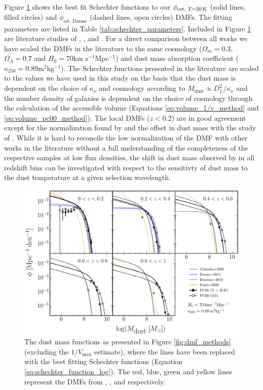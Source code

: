 Figure \ref{fig:dmf_schechter} shows the best fit Schechter functions to our $\phi_{\textrm{est, T=20\,K}}$ (solid lines, filled circles) and $\phi_{\textrm{est, Dunne}}$ (dashed lines, open circles) DMFs. The fitting parameters are listed in Table \ref{tab:schechter_parameters}. Included in Figure \ref{fig:dmf_schechter} are literature studies of \citealt{Vlahakis_2005}, \citealt{Dunne_2011}, \citealt{Beeston_2018} and \citealt{Pozzi_2020}. For a direct comparison between all works we have scaled the DMFs in the literature to the same cosmology ($\Omega_m = 0.3$, $\Omega_\Lambda = 0.7$ and $H_0 = 70$km s$^{-1}$Mpc$^{-1}$) and dust mass absorption coefficient ($\kappa_{250} = 0.89$m$^{2}$kg$^{-1}$). The Schechter functions presented in the literature are scaled to the values we have used in this study on the basis that the dust mass is dependent on the choice of $\kappa_\nu$ and cosmology according to $M_{\textrm{dust}} \propto D_L^2/\kappa_\nu$ and the number density of galaxies is dependent on the choice of cosmology through the calculation of the accessible volume (Equations \ref{eq:volume_1/v_method} and \ref{eq:volume_pc00_method}). The local DMFs ($z < 0.2$) are in good agreement except for the normalization found by \citealt{Dunne_2011} and the offset in dust mass with the study of \citealt{Pozzi_2020}. While it is hard to reconcile the low normalization of the \citealt{Dunne_2011} DMF with other works in the literature without a full understanding of the completeness of the respective samples at low flux densities, the shift in dust mass observed by \citealt{Pozzi_2020} in all redshift bins can be investigated with respect to the sensitivty of dust mass to the dust temperature at a given selection wavelength.

\begin{figure}
	\centering
	\includegraphics[width=0.9\columnwidth]{Figures/dmf_schechter.pdf}
	\caption{The dust mass functions as presented in Figure \ref{fig:dmf_methods} (excluding the $1/V_{\textrm{max}}$ estimate), where the lines have been replaced with the best fitting Schechter functions (Equation \ref{eq:schechter_function_log}). The red, blue, green and yellow lines represent the DMFs from \citealt{Vlahakis_2005}, \citealt{Dunne_2011}, \citealt{Beeston_2018} and \citealt{Pozzi_2020} respectively.}
	\label{fig:dmf_schechter}
\end{figure}


